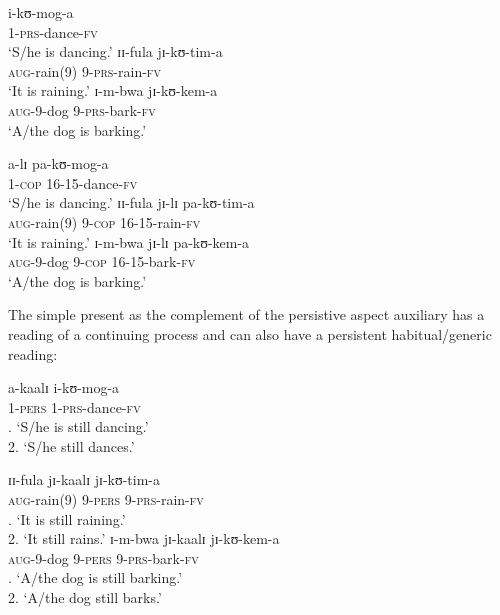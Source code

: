 \begin{exe}
\ex \label{exActivityPRS}
\begin{xlist}
\ex \gll i-kʊ-mog-a\\
 1-\textsc{prs}-dance-\textsc{fv}\\
\glt `S/he is dancing.'
\ex \gll ɪɪ-fula jɪ-kʊ-tim-a\\
\textsc{aug}-rain(9) 9-\textsc{prs}-rain-\textsc{fv}\\
\glt `It is raining.'
\ex \gll ɪ-m-bwa jɪ-kʊ-kem-a\\
\textsc{aug}-9-dog 9-\textsc{prs}-bark-\textsc{fv}\\
\glt `A/the dog is barking.'
\end{xlist}

\ex \label{exActivityPROG}
\begin{xlist}
\ex \gll a-lɪ pa-kʊ-mog-a\\
1-\textsc{cop} 16-15-dance-\textsc{fv}\\
\glt `S/he is dancing.'
\ex \gll ɪɪ-fula jɪ-lɪ pa-kʊ-tim-a\\
\textsc{aug}-rain(9) 9-\textsc{cop} 16-15-rain-\textsc{fv}\\
\glt \lq It is raining.'
\ex \gll ɪ-m-bwa jɪ-lɪ pa-kʊ-kem-a\\
\textsc{aug}-9-dog 9-\textsc{cop} 16-15-bark-\textsc{fv}\\
\glt `A/the dog is barking.'
\end{xlist}
\end{exe}

The simple present as the complement of the persistive aspect auxiliary has a reading of a continuing process and can also have a persistent habitual/generic reading:
\begin{exe}
\ex \label{exActivityPersPRS}
\begin{xlist}
\ex \gll a-kaalɪ i-kʊ-mog-a\\
1-\textsc{pers} 1-\textsc{prs}-dance-\textsc{fv}\\
. \lq S/he is still dancing.' \\ 2. \lq S/he still dances.'

\ex \gll ɪɪ-fula jɪ-kaalɪ jɪ-kʊ-tim-a\\
\textsc{aug}-rain(9) 9-\textsc{pers} 9-\textsc{prs}-rain-\textsc{fv}\\
. \lq It is still raining.' \\ 2. \lq It still rains.'
\ex \gll ɪ-m-bwa jɪ-kaalɪ jɪ-kʊ-kem-a\\
\textsc{aug}-9-dog 9-\textsc{pers} 9-\textsc{prs}-bark-\textsc{fv}\\
. \lq A/the dog is still barking.' \\ 2. \lq A/the dog still barks.'
\end{xlist}
\end{exe}


